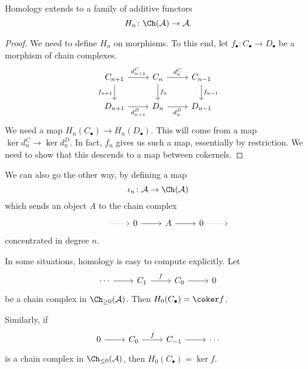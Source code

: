 \documentclass[main.tex]{subfiles}
\begin{document}
\begin{proposition}
  Homology extends to a family of additive functors
  \begin{equation*}
    H_{n}\colon \Ch(\mathcal{A}) \to \mathcal{A}.
  \end{equation*}
\end{proposition}
\begin{proof}
  We need to define $H_{n}$ on morphisms. To this end, let $f_{\bullet}\colon C_{\bullet} \to D_{\bullet}$ be a morphism of chain complexes.
  \begin{equation*}
    \begin{tikzcd}
      C_{n+1}
      \arrow[r, "d^{C}_{n+1}"]
      \arrow[d, swap, "f_{n+1}"]
      & C_{n}
      \arrow[r, "d^{C}_{n}"]
      \arrow[d, "f_{n}"]
      & C_{n-1}
      \arrow[d, "f_{n-1}"]
      \\
      D_{n+1}
      \arrow[r, swap, "d^{D}_{n+1}"]
      & D_{n}
      \arrow[r, swap, "d^{D}_{n}"]
      & D_{n-1}
    \end{tikzcd}
  \end{equation*}
  We need a map $H_{n}(C_{\bullet}) \to H_{n}(D_{\bullet})$. This will come from a map $\ker d^{C}_{n} \to \ker d^{D}_{n}$. In fact, $f_{n}$ gives us such a map, essentially by restriction. We need to show that this descends to a map between cokernels.
\end{proof}

We can also go the other way, by defining a map
\begin{equation*}
  \iota_{n}\colon \mathcal{A} \to \Ch(\mathcal{A})
\end{equation*}
which sends an object $A$ to the chain complex
\begin{equation*}
  \begin{tikzcd}
    &{\ }
    \arrow[r, dotted]
    & 0
    \arrow[r]
    & A
    \arrow[r]
    & 0
    \arrow[r, dotted]
    &{\ }
  \end{tikzcd}
\end{equation*}
concentrated in degree $n$.

\begin{example}
  \label{eg:compute_homology_in_trivial_situation}
  In some situations, homology is easy to compute explicitly. Let
  \begin{equation*}
    \begin{tikzcd}
      \cdots
      \arrow[r]
      & C_{1}
      \arrow[r, "f"]
      & C_{0}
      \arrow[r]
      & 0
    \end{tikzcd}
  \end{equation*}
  be a chain complex in $\Ch_{\geq 0}(\mathcal{A})$. Then $H_{0}(C_{\bullet}) = \coker f$.

  Similarly, if
  \begin{equation*}
    \begin{tikzcd}
      0
      \arrow[r]
      & C_{0}
      \arrow[r, "f"]
      & C_{-1}
      \arrow[r]
      & \cdots
    \end{tikzcd}
  \end{equation*}
  is a chain complex in $\Ch_{\leq 0}(\mathcal{A})$, then $H_{0}(C_{\bullet}) = \ker f$.
\end{example}
\end{document}
